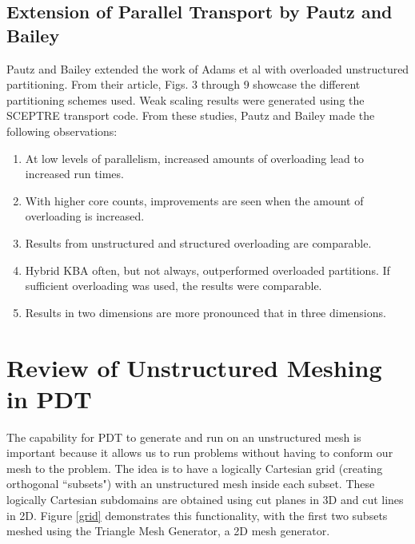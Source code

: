 \documentclass[11pt, letterpaper,titlepage,oneside]{article}
\begin{document}
\subsection{Extension of Parallel Transport by Pautz and Bailey}
Pautz and Bailey\cite{PautzBailey} extended the work of Adams et al with overloaded unstructured partitioning. From their article, Figs. 3 through 9\cite{PautzBailey} showcase the different partitioning schemes used.  Weak scaling results were generated using the SCEPTRE transport code\cite{sceptre}. From these studies, Pautz and Bailey made the following observations:
\begin{enumerate}
	\item At low levels of parallelism, increased amounts of overloading lead to increased run times.
	\item With higher core counts, improvements are seen when the amount of overloading is increased.
	\item Results from unstructured and structured overloading are comparable. 
	\item Hybrid KBA often, but not always, outperformed overloaded partitions. If sufficient overloading was used, the results were comparable.
	\item Results in two dimensions are more pronounced that in three dimensions.
\end{enumerate}


\section{Review of Unstructured Meshing in PDT}

The capability for PDT to generate and run on an unstructured mesh is important because it allows us to run problems without having to conform our mesh to the problem. The idea is to have a logically Cartesian grid (creating orthogonal ``subsets") with an unstructured mesh inside each subset. These logically Cartesian subdomains are obtained using cut planes in 3D and cut lines in 2D. Figure \ref{grid} demonstrates this functionality, with the first two subsets meshed using the Triangle Mesh Generator\cite{triangle}, a 2D mesh generator. 
\end{document}

